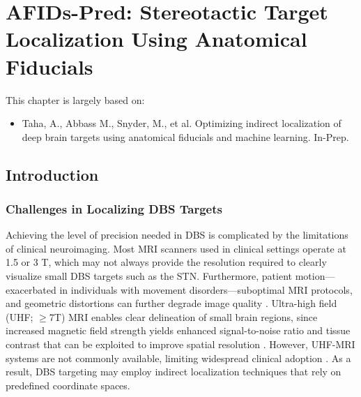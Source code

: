 \chapter{AFIDs-Pred: Stereotactic Target Localization Using Anatomical Fiducials}\label{chap:afidspred}
\newpage
\sloppy
This chapter is largely based on:
\begin{itemize}[noitemsep,topsep=0pt]
	\item Taha, A., Abbass M., Snyder, M., et al. Optimizing indirect localization of deep brain targets using anatomical fiducials and machine learning. In-Prep.
\end{itemize}

\section{Introduction}
\subsection{Challenges in Localizing DBS Targets}
Achieving the level of precision needed in DBS is complicated by the limitations of clinical neuroimaging. Most MRI scanners used in clinical settings operate at 1.5 or 3 T, which may not always provide the resolution required to clearly visualize small DBS targets such as the STN. Furthermore, patient motion—exacerbated in individuals with movement disorders—suboptimal MRI protocols, and geometric distortions can further degrade image quality \cite{Boutet2021-vg, Chandran2016-eg, Lau2018-fp}. Ultra-high field (UHF; $\geq$7T) MRI enables clear delineation of small brain regions, since increased magnetic field strength yields enhanced signal-to-noise ratio and tissue contrast that can be exploited to improve spatial resolution \cite{Abosch2010-jn, Duchin2012-db, Lau2017-ea, Lau2020-dh, Lenglet2012-ii}. However, UHF-MRI systems are not commonly available, limiting widespread clinical adoption \cite{Clarke2020-ky}. As a result, DBS targeting may employ indirect localization techniques that rely on predefined coordinate spaces.

